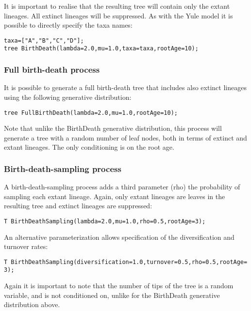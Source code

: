 \documentclass[10pt,letterpaper,table]{article}
\begin{document}
{It is important to realise that the resulting tree will contain only the extant lineages. All extinct lineages will be
suppressed. As with the Yule model it is possible to directly specify the taxa names:

\begin{alltt}
  taxa = ["A", "B", "C", "D"];
  tree ~ BirthDeath(lambda=2.0, mu=1.0, taxa=taxa, rootAge=10);
\end{alltt}

\subsubsection*{Full birth-death process}

It is possible to generate a full birth-death tree that includes also extinct lineages using the following generative
distribution:

\begin{alltt}
  tree ~ FullBirthDeath(lambda=2.0, mu=1.0, rootAge=10);
\end{alltt}

Note that unlike the BirthDeath generative distribution, this process will generate a tree with a random number of
leaf nodes, both in terms of extinct and extant lineages. The only conditioning is on the root age.

\subsubsection*{Birth-death-sampling process}

A birth-death-sampling process adds a third parameter (rho) the probability of sampling each extant lineage. Again,
only extant lineages are leaves in the resulting tree and extinct lineages are suppressed:

\begin{alltt}
  T ~ BirthDeathSampling(lambda=2.0, mu=1.0, rho=0.5, rootAge=3);
\end{alltt}

An alternative parameterization allows specification of the diversification and turnover rates:

\begin{alltt}
  T ~ BirthDeathSampling(diversification=1.0, turnover=0.5, rho=0.5, rootAge=3);
\end{alltt}

Again it is important to note that the number of tips of the tree is a random variable, and is not conditioned on,
unlike for the BirthDeath generative distribution above.

}
\end{document}
